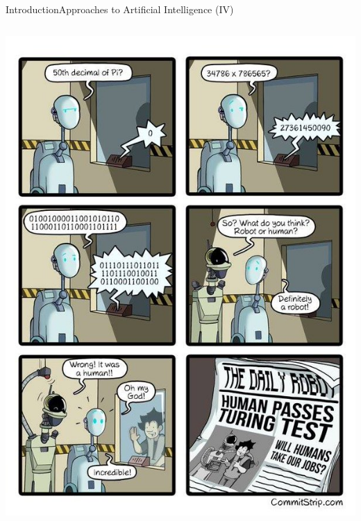 \documentclass[10pt,compress]{beamer} %
\begin{document}
\begin{frame}[plain]{Introduction}{Approaches to Artificial Intelligence (IV)}
	\vspace{-0.5cm}
	\begin{columns}
		\includegraphics[width=\linewidth]{figs/turingRobot.jpg}
	\end{columns}
\end{frame}
\end{document}
